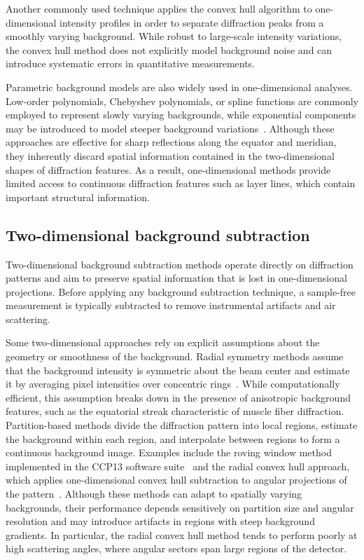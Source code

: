 \documentclass[iucr]{iucrjournals}
\begin{document}
Another commonly used technique applies the convex hull algorithm to one-dimensional intensity profiles in order to separate diffraction peaks from a smoothly varying background. While robust to large-scale intensity variations, the convex hull method does not explicitly model background noise and can introduce systematic errors in quantitative measurements.

Parametric background models are also widely used in one-dimensional analyses. Low-order polynomials, Chebyshev polynomials, or spline functions are commonly employed to represent slowly varying backgrounds, while exponential components may be introduced to model steeper background variations~\cite{rajkumar2007fibrefix}. Although these approaches are effective for sharp reflections along the equator and meridian, they inherently discard spatial information contained in the two-dimensional shapes of diffraction features. As a result, one-dimensional methods provide limited access to continuous diffraction features such as layer lines, which contain important structural information.

\subsection{Two-dimensional background subtraction}

Two-dimensional background subtraction methods operate directly on diffraction patterns and aim to preserve spatial information that is lost in one-dimensional projections. Before applying any background subtraction technique, a sample-free measurement is typically subtracted to remove instrumental artifacts and air scattering.

Some two-dimensional approaches rely on explicit assumptions about the geometry or smoothness of the background. Radial symmetry methods assume that the background intensity is symmetric about the beam center and estimate it by averaging pixel intensities over concentric rings~\cite{rajkumar2007fibrefix}. While computationally efficient, this assumption breaks down in the presence of anisotropic background features, such as the equatorial streak characteristic of muscle fiber diffraction. Partition-based methods divide the diffraction pattern into local regions, estimate the background within each region, and interpolate between regions to form a continuous background image. Examples include the roving window method implemented in the CCP13 software suite~\cite{HeEtAl2007} and the radial convex hull approach, which applies one-dimensional convex hull subtraction to angular projections of the pattern~\cite{MuscleXQuadrantFolding}. Although these methods can adapt to spatially varying backgrounds, their performance depends sensitively on partition size and angular resolution and may introduce artifacts in regions with steep background gradients. In particular, the radial convex hull method tends to perform poorly at high scattering angles, where angular sectors span large regions of the detector.
\end{document}
